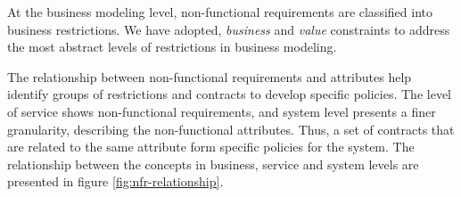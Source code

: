 \documentclass{sig-alternate}
\begin{document}
At the business modeling level, non-functional requirements are classified
into business restrictions. We have adopted, \textit{business} and \textit{value}
constraints to address the most abstract levels of restrictions in business
modeling. 

 



The relationship between non-functional requirements and attributes help
identify groups of restrictions and contracts to develop specific policies. The
level of service shows non-functional requirements, and system level presents a
finer granularity, describing the non-functional attributes. Thus, a set of
contracts that are related to the same attribute form specific policies for the
system. The relationship between the concepts in business, service and system
levels are presented in figure \ref{fig:nfr-relationship}.


\end{document}
